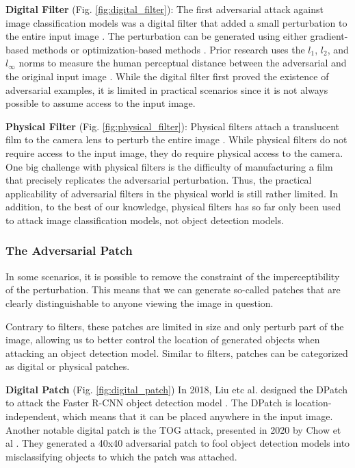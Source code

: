 \textbf{Digital Filter} (Fig. \ref{fig:digital_filter}): The first adversarial attack against image classification models was a digital filter that added a small perturbation to the entire input image \citep{GoodfellowSS14}. The perturbation can be generated using either gradient-based methods \citep{madryMSTV18} \citep{kurakin2018adversarial} \citep{wong2019wasserstein} \citep{croce2020reliable} or optimization-based methods \citep{papernot2016transferability} \citep{carlini2017towards} \citep{qin2019imperceptible}. Prior research uses the $l_1$, $l_2$, and $l_{\infty}$ norms to measure the human perceptual distance between the adversarial and the original input image \citep{miyato2015distributional} \citep{sabour2015adversarial} \citep{chen2018ead}. While the digital filter first proved the existence of adversarial examples, it is limited in practical scenarios since it is not always possible to assume access to the input image.

\textbf{Physical Filter} (Fig. \ref{fig:physical_filter}): Physical filters attach a translucent film to the camera lens to perturb the entire image \citep{li2019adversarial}. While physical filters do not require access to the input image, they do require physical access to the camera. One big challenge with physical filters is the difficulty of manufacturing a film that precisely replicates the adversarial perturbation. Thus, the practical applicability of adversarial filters in the physical world is still rather limited. In addition, to the best of our knowledge, physical filters has so far only been used to attack image classification models, not object detection models. 


\subsubsection{The Adversarial Patch}

In some scenarios, it is possible to remove the constraint of the imperceptibility of the perturbation. This means that we can generate so-called patches that are clearly distinguishable to anyone viewing the image in question. 

Contrary to filters, these patches are limited in size and only perturb part of the image, allowing us to better control the location of generated objects when attacking an object detection model. Similar to filters, patches can be categorized as digital or physical patches.

\textbf{Digital Patch} (Fig. \ref{fig:digital_patch}) In 2018, Liu etc al. designed the DPatch \citep{liu2018dpatch} to attack the Faster R-CNN object detection model \citep{ren2015faster}. The DPatch is location-independent, which means that it can be placed anywhere in the input image. Another notable digital patch is the TOG attack, presented in 2020 by Chow et al \citep{chow2020adversarial}. They generated a 40x40 adversarial patch to fool object detection models into misclassifying objects to which the patch was attached.

